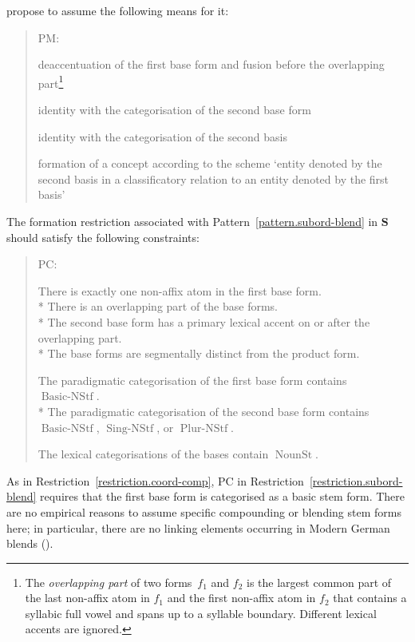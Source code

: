 \documentclass[output=paper
  ,nobabel
  ,draftmode
  ,colorlinks, citecolor=brown
]{langscibook}
\begin{document}
propose to assume the following means for it: \begin{quotation}
\begin{pattern}
\label{pattern.subord-blend}\vspace{-1.25\baselineskip}
\begin{labeledlist}{PM:}
\item[FM:] \raggedright deaccentuation of the first base form and fusion before the overlapping
part\footnote{The \emph{overlapping part} of two forms $f_{1}$ and $f_{2}$ is the largest common part of the last non-affix atom in $f_{1}$ and the first non-affix atom in $f_{2}$ that contains a syllabic full vowel and spans up to a syllable
boundary. Different lexical accents are ignored.}
\item[PM:] \raggedright identity with the categorisation of the second base form
\item[LM:] \raggedright identity with the categorisation of the second basis
\item[SM:] \raggedright formation of a concept according to the scheme ‘entity denoted by
the second basis in a classificatory relation to an entity denoted by the first
basis’
\end{labeledlist}
\end{pattern}
\end{quotation} The formation restriction associated with Pattern \ref{pattern.subord-blend} in $\mathbf{S}$ should satisfy the following constraints: \begin{quotation}
\begin{restriction}
\label{restriction.subord-blend}\vspace{-1.25\baselineskip}
\begin{labeledlist}{PC:}
\item[FC:] \raggedright There is exactly one non-affix atom in the first base
form.\\*{}
There is an overlapping part of the base forms.\\*{}
The second base form has a primary lexical accent on or after the overlapping
part.\\*{}
The base forms are segmentally distinct from the product form.
\item[PC:] \raggedright The paradigmatic categorisation of the first base form contains $\operatorname{Basic-NStf}$.\\*{}
The paradigmatic categorisation of the second base form contains $\operatorname{Basic-NStf}$, $\operatorname{Sing-NStf}$, or $\operatorname{Plur-NStf}$.
\item[LC:] \raggedright The lexical categorisations of the bases contain $\operatorname{NounSt}$.
\end{labeledlist}
\end{restriction}
\end{quotation} As in Restriction \ref{restriction.coord-comp}, PC in Restriction \ref{restriction.subord-blend} requires that the first base form is
categorised as a basic stem form. There are no empirical reasons to assume
specific compounding or blending stem forms here; in particular, there are no linking elements
occurring in Modern German blends (\citealt[78]{mueller:et:al:2011:kontamination}).
\end{document}
